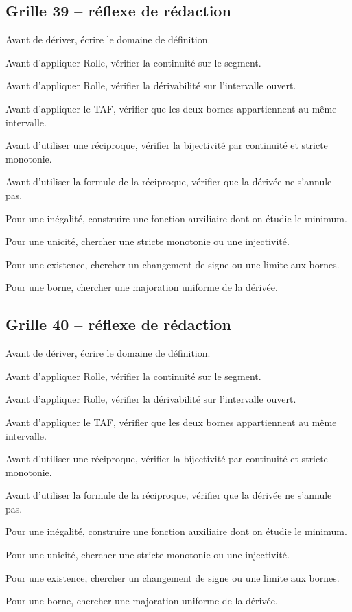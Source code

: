 \documentclass[11pt,a4paper]{article}
\begin{document}
\subsection*{Grille 39 -- réflexe de rédaction}

\begin{methodebox}

Avant de dériver, écrire le domaine de définition.

Avant d'appliquer Rolle, vérifier la continuité sur le segment.

Avant d'appliquer Rolle, vérifier la dérivabilité sur l'intervalle ouvert.

Avant d'appliquer le TAF, vérifier que les deux bornes appartiennent au même intervalle.

Avant d'utiliser une réciproque, vérifier la bijectivité par continuité et stricte monotonie.

Avant d'utiliser la formule de la réciproque, vérifier que la dérivée ne s'annule pas.

Pour une inégalité, construire une fonction auxiliaire dont on étudie le minimum.

Pour une unicité, chercher une stricte monotonie ou une injectivité.

Pour une existence, chercher un changement de signe ou une limite aux bornes.

Pour une borne, chercher une majoration uniforme de la dérivée.

\end{methodebox}

\subsection*{Grille 40 -- réflexe de rédaction}

\begin{methodebox}

Avant de dériver, écrire le domaine de définition.

Avant d'appliquer Rolle, vérifier la continuité sur le segment.

Avant d'appliquer Rolle, vérifier la dérivabilité sur l'intervalle ouvert.

Avant d'appliquer le TAF, vérifier que les deux bornes appartiennent au même intervalle.

Avant d'utiliser une réciproque, vérifier la bijectivité par continuité et stricte monotonie.

Avant d'utiliser la formule de la réciproque, vérifier que la dérivée ne s'annule pas.

Pour une inégalité, construire une fonction auxiliaire dont on étudie le minimum.

Pour une unicité, chercher une stricte monotonie ou une injectivité.

Pour une existence, chercher un changement de signe ou une limite aux bornes.

Pour une borne, chercher une majoration uniforme de la dérivée.

\end{methodebox}
\end{document}
